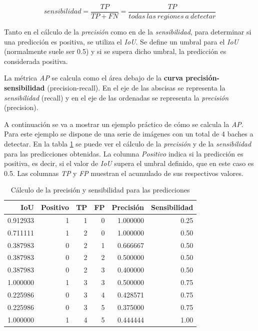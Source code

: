\begin{equation}
	sensibilidad = \frac{TP}{TP + FN} = \frac{TP}{todas\ las\ regiones\ a\ detectar}
	\nonumber
\end{equation}

Tanto en el cálculo de la \textit{precisión} como en de la \textit{sensibilidad}, para determinar si una predicción es positiva, se utiliza el \textit{IoU}. Se define un umbral para el \textit{IoU} (normalmente suele ser 0.5) y si se supera dicho umbral, la predicción es considerada positiva.

La métrica \textit{AP} se calcula como el área debajo de la \textbf{curva precisión-sensibilidad} (precision-recall). En el eje de las abscisas se representa la \textit{sensibilidad} (recall) y en el eje de las ordenadas se representa la \textit{precisión} (precision).

A continuación se va a mostrar un ejemplo práctico de cómo se calcula la \textit{AP}. Para este ejemplo se dispone de una serie de imágenes con un total de 4 baches a detectar. En la tabla \ref{tab:apprecisionrecalltable} se puede ver el cálculo de la \textit{precisión} y de la \textit{sensibilidad} para las predicciones obtenidas. La columna \textit{Positivo} indica si la predicción es positiva, es decir, si el valor de \textit{IoU} supera el umbral definido, que en este caso es 0.5. Las columnas \textit{TP} y \textit{FP} muestran el acumulado de sus respectivos valores.

\begin{table}[H]
	\centering
	\begin{tabular}{rrrrrr}
		\toprule
		IoU &  Positivo &  TP &  FP &  Precisión &  Sensibilidad \\
		\midrule
		0.912933 &         1 &   1 &   0 &   1.000000 &          0.25 \\
		0.711111 &         1 &   2 &   0 &   1.000000 &          0.50 \\
		0.387983 &         0 &   2 &   1 &   0.666667 &          0.50 \\
		0.387983 &         0 &   2 &   2 &   0.500000 &          0.50 \\
		0.387983 &         0 &   2 &   3 &   0.400000 &          0.50 \\
		1.000000 &         1 &   3 &   3 &   0.500000 &          0.75 \\
		0.225986 &         0 &   3 &   4 &   0.428571 &          0.75 \\
		0.225986 &         0 &   3 &   5 &   0.375000 &          0.75 \\
		1.000000 &         1 &   4 &   5 &   0.444444 &          1.00 \\
		\bottomrule
	\end{tabular}
	\caption{Cálculo de la precisión y sensibilidad para las predicciones}
	\label{tab:apprecisionrecalltable}
\end{table}

